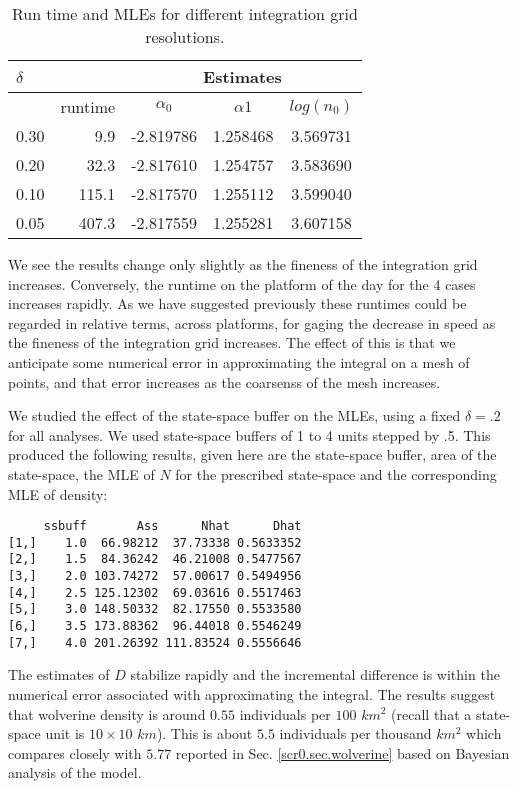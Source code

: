 \begin{table}[ht]
\centering
\caption{Run time and MLEs for different integration grid resolutions.}
\begin{tabular}{l|rccc}
\hline \hline
$\delta$ &   & \multicolumn{3}{c}{Estimates} \\ \hline
         &  runtime        & $\alpha_0$ & $\alpha1$ & $log(n_0)$ \\ \hline
 0.30   &  9.9  &  -2.819786 & 1.258468 & 3.569731  \\
 0.20   & 32.3  &  -2.817610 & 1.254757 & 3.583690 \\
 0.10  & 115.1  &  -2.817570 & 1.255112 & 3.599040 \\
 0.05 &  407.3 &   -2.817559&  1.255281&  3.607158 \\
\end{tabular}
\label{mle.tab.integration}
\end{table}


We see the results change only slightly as the fineness of the
integration grid increases. Conversely, the runtime on the platform of
the day for the 4 cases increases rapidly. 
As we have suggested previously these runtimes could be regarded in
relative terms,  across platforms, for gaging the decrease in
speed as the fineness of the integration grid increases. The effect of
this is that we anticipate some numerical error in approximating the
integral on a mesh of points, and that error increases as the
coarsenss of the mesh increases. 


We studied the effect of the state-space buffer on the MLEs,
using a fixed $\delta = .2$ for all analyses. We used state-space buffers
of 1 to 4 units stepped by .5. This produced the following results,
given here are the state-space buffer, area of the state-space, the
MLE of $N$ for the prescribed state-space and the corresponding MLE of
density:
{\small
\begin{verbatim}
     ssbuff       Ass      Nhat      Dhat
[1,]    1.0  66.98212  37.73338 0.5633352
[2,]    1.5  84.36242  46.21008 0.5477567
[3,]    2.0 103.74272  57.00617 0.5494956
[4,]    2.5 125.12302  69.03616 0.5517463
[5,]    3.0 148.50332  82.17550 0.5533580
[6,]    3.5 173.88362  96.44018 0.5546249
[7,]    4.0 201.26392 111.83524 0.5556646
\end{verbatim}
}
The estimates of $D$ stabilize rapidly and the incremental difference
is within the numerical error associated with approximating the
integral.  The results suggest that wolverine density is around $0.55$
individuals per $100$ $km^2$ (recall that a state-space unit is $10
\times 10$ $km$).  This is about $5.5$ individuals per thousand $km^2$
which compares closely with $5.77$ reported
in Sec. \ref{scr0.sec.wolverine} based on Bayesian analysis of the
model.



